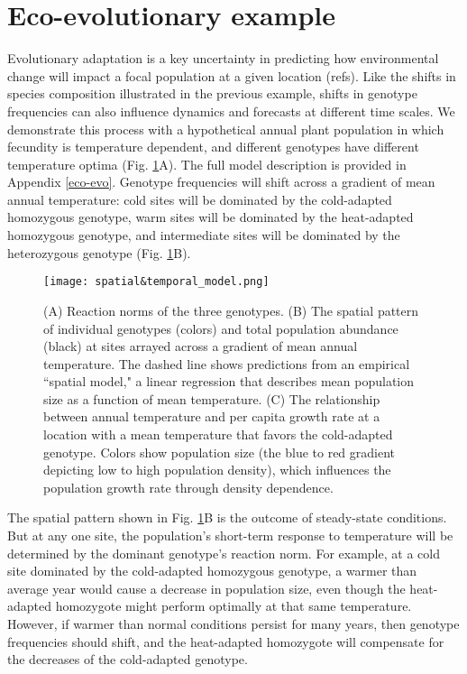 \documentclass[11pt]{article}
\begin{document}
\section*{Eco-evolutionary example}

Evolutionary adaptation is a key uncertainty in predicting how environmental change will impact a focal population at a given location (refs). Like the shifts
in species composition illustrated in the previous example, shifts in genotype frequencies can also influence dynamics and forecasts at different time scales.
We demonstrate this process with a hypothetical annual plant population in which fecundity is temperature dependent, and different genotypes have different temperature optima (Fig. \ref{fig:evo_evo_spatial_temporal_models}A). The full model description is provided in Appendix \ref{eco-evo}. Genotype frequencies will shift across a gradient of mean annual temperature: cold sites will be dominated by the cold-adapted homozygous genotype, warm sites will be dominated by the heat-adapted homozygous genotype, and intermediate sites will be dominated by the heterozygous genotype (Fig. \ref{fig:evo_evo_spatial_temporal_models}B).

\begin{figure}[tbp]
\centering
\texttt{[image: spatial\&temporal\_model.png]}
\caption{(A) Reaction norms of the three genotypes. (B) The spatial pattern of individual genotypes (colors) and total population abundance (black) at sites arrayed across a gradient of mean annual temperature. The dashed line shows predictions from an empirical ``spatial model," a linear regression that describes mean population size as a function of mean temperature. (C) The relationship between annual temperature and per capita growth rate at a location with a mean temperature that favors the cold-adapted genotype. Colors show population size (the blue to red gradient depicting low to high population density), which influences the population growth rate through density dependence. }
\label{fig:evo_evo_spatial_temporal_models}
\end{figure}

The spatial pattern shown in Fig. \ref{fig:evo_evo_spatial_temporal_models}B is the outcome of steady-state conditions. But at any one site, the population's short-term response to temperature will be determined by the dominant genotype's reaction norm. For example, at a cold site dominated by the cold-adapted homozygous genotype, a warmer than average year would cause a decrease in population size, even though the heat-adapted homozygote might perform optimally at that same temperature. However, if warmer than normal conditions persist for many years, then genotype frequencies should shift, and the heat-adapted homozygote will compensate for the decreases of the cold-adapted genotype. 
\end{document}
